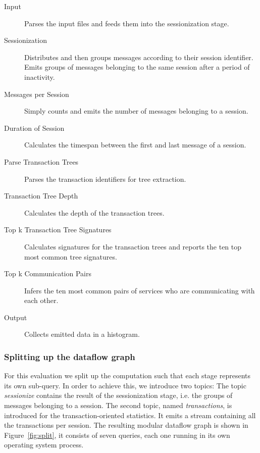 \begin{description}
\item [Input] Parses the input files and feeds them into the sessionization stage.
\item [Sessionization] Distributes and then groups messages according to their session identifier.
Emits groups of messages belonging to the same session after a period of inactivity.
\item [Messages per Session] Simply counts and emits the number of messages belonging to a session.
\item [Duration of Session] Calculates the timespan between the first and last message of a session.
\item [Parse Transaction Trees] Parses the transaction identifiers for tree extraction.
\item [Transaction Tree Depth] Calculates the depth of the transaction trees.
\item [Top k Transaction Tree Signatures] Calculates signatures for the transaction trees and
reports the ten top most common tree signatures.
\item [Top k Communication Pairs] Infers the ten most common pairs of services who are
communicating with each other.
\item [Output] Collects emitted data in a histogram.
\end{description}

\subsubsection{Splitting up the dataflow graph}

For this evaluation we split up the computation such that each stage represents
its own sub-query. In order to achieve this, we introduce two topics: The topic
\emph{sessionize} contains the result of the sessionization stage, i.e. 
the groups of messages belonging to a session. The second topic, named
\emph{transactions}, is introduced for the transaction-oriented statistics.
It emits a stream containing all the transactions per session. The resulting
modular dataflow graph is shown in Figure~\ref{fig:split}, it consists of
seven queries, each one running in its own operating system process.

